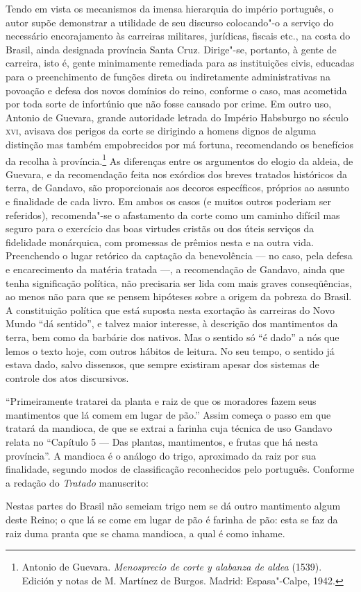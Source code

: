 Tendo em vista os mecanismos da imensa hierarquia do império português,
o autor supõe demonstrar a utilidade de seu discurso colocando"-o a
serviço do necessário encorajamento às carreiras militares, jurídicas,
fiscais etc., na costa do Brasil, ainda designada província Santa
Cruz. Dirige"-se, portanto, à gente de carreira, isto é, gente
minimamente remediada para as instituições civis, educadas para o
preenchimento de funções direta ou indiretamente administrativas na
povoação e defesa dos novos domínios do reino, conforme o caso, mas
acometida por toda sorte de infortúnio que não fosse causado por crime.
Em outro uso, Antonio de Guevara, grande autoridade letrada do Império
Habsburgo no século \textsc{xvi}, avisava dos perigos da corte se dirigindo a
homens dignos de alguma distinção mas também empobrecidos por má
fortuna, recomendando os benefícios da recolha à província.\footnote{ Antonio 
de Guevara. \textit{Menosprecio de corte y alabanza de aldea} (1539).
Edición y notas de M. Martínez de Burgos. Madrid: Espasa"-Calpe, 1942.}
As diferenças entre os argumentos do elogio da aldeia, de Guevara, e da
recomendação feita nos exórdios dos breves tratados históricos da
terra, de Gandavo, são proporcionais aos decoros específicos, próprios
ao assunto e finalidade de cada livro. Em ambos os casos (e muitos
outros poderiam ser referidos), recomenda"-se o afastamento da corte
como um caminho difícil mas seguro para o exercício das boas virtudes
cristãs ou dos úteis serviços da fidelidade monárquica, com promessas
de prêmios nesta e na outra vida. Preenchendo o lugar retórico da
captação da benevolência --- no caso, pela defesa  e encarecimento da
matéria tratada ---, a recomendação de Gandavo, ainda que tenha
significação política, não precisaria ser lida com mais graves
conseqüências, ao menos não para que se pensem hipóteses sobre a origem
da pobreza do Brasil. A constituição política que está suposta nesta
exortação às carreiras do Novo Mundo ``dá sentido'', e talvez maior interesse, 
à descrição dos mantimentos da terra, bem como da barbárie dos nativos. 
Mas o sentido só ``é dado'' a nós que lemos o texto hoje, com outros hábitos de leitura. 
No seu tempo, o sentido já estava dado, salvo dissensos, que sempre existiram 
apesar dos sistemas de controle dos atos discursivos. 

``Primeiramente tratarei da planta e raiz de que os
moradores fazem seus mantimentos que lá comem em lugar de
pão.'' Assim começa o passo em que tratará da mandioca, de
que se extrai a farinha cuja técnica de uso Gandavo relata no
``Capítulo 5 --- Das plantas, mantimentos, e frutas que há
nesta província''. A mandioca é o análogo do trigo,
aproximado da raiz por sua finalidade, segundo modos de classificação
reconhecidos pelo português. Conforme a redação do \textit{Tratado} manuscrito:
\begin{hedraquote}
Nestas partes do Brasil não semeiam trigo nem se dá outro mantimento algum
deste Reino; o que lá se come em lugar de pão é farinha de pão: esta
se faz da raiz duma pranta que se chama mandioca, a qual é como inhame.
\end{hedraquote}

